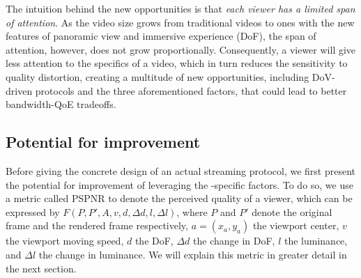 The intuition behind the new opportunities is that {\em each viewer has a limited span of attention}.
As the video size grows from traditional videos to \vr ones with the new features of panoramic view and immersive experience (\eg DoF), the span of attention, however, does not grow proportionally. 
Consequently, a viewer will give less attention to the specifics of a \vr video, which in turn reduces the sensitivity to quality distortion, creating a multitude of new opportunities, including DoV-driven protocols and the three aforementioned factors, that could lead to better bandwidth-QoE tradeoffs.





\subsection{Potential for improvement}
\label{subsec:potentials}

Before giving the concrete design of an actual streaming protocol, we first present the potential for improvement of leveraging the \vr-specific factors. 
To do so, we use a metric called PSPNR to denote the perceived quality of a viewer, which can be expressed by $F(P,P',A,v,d,\Delta d,l,\Delta l)$, where $P$ and $P'$ denote the original frame and the rendered frame respectively, $a=(x_a,y_a)$ the viewport center, $v$ the viewport moving speed, $d$ the DoF, $\Delta d$ the change in DoF, $l$ the luminance, and $\Delta l$ the change in luminance. 
We will explain this metric in greater detail in the next section. 


